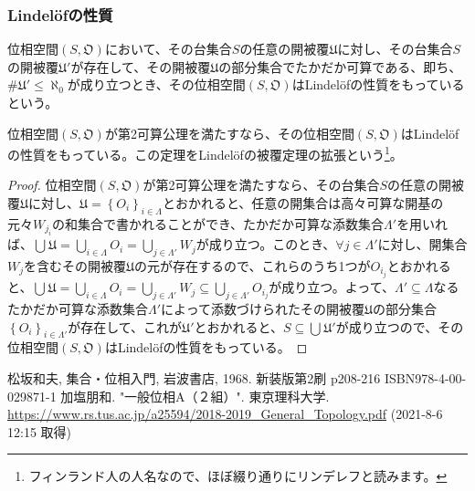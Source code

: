\documentclass[dvipdfmx]{jsarticle}
\begin{document}
\subsubsection{Lindelöfの性質}%
\begin{dfn}
位相空間$\left( S,\mathfrak{O} \right)$において、その台集合$S$の任意の開被覆$\mathfrak{U}$に対し、その台集合$S$の開被覆$\mathfrak{U}'$が存在して、その開被覆$\mathfrak{U}$の部分集合でたかだか可算である、即ち、${\#}\mathfrak{U}' \leq \aleph_{0}$が成り立つとき、その位相空間$\left( S,\mathfrak{O} \right)$はLindelöfの性質をもっているという。
\end{dfn}
\begin{thm}[Lindelöfの被覆定理の拡張]\label{8.1.6.16}
位相空間$\left( S,\mathfrak{O} \right)$が第2可算公理を満たすなら、その位相空間$\left( S,\mathfrak{O} \right)$はLindelöfの性質をもっている。この定理をLindelöfの被覆定理の拡張という\footnote{フィンランド人の人名なので、ほぼ綴り通りにリンデレフと読みます。}。
\end{thm}
\begin{proof}
位相空間$\left( S,\mathfrak{O} \right)$が第2可算公理を満たすなら、その台集合$S$の任意の開被覆$\mathfrak{U}$に対し、$\mathfrak{U} =\left\{ O_{i} \right\}_{i \in \varLambda}$とおかれると、任意の開集合は高々可算な開基の元々$W_{j_{i}}$の和集合で書かれることができ、たかだか可算な添数集合$\varLambda'$を用いれば、$\bigcup_{} \mathfrak{U} = \bigcup_{i \in \varLambda} O_{i} = \bigcup_{j \in \varLambda' } W_{j}$が成り立つ。このとき、$\forall j \in \varLambda'$に対し、開集合$W_{j}$を含むその開被覆$\mathfrak{U}$の元が存在するので、これらのうち1つが$O_{i_{j}}$とおかれると、$\bigcup_{} \mathfrak{U} = \bigcup_{i \in \varLambda} O_{i} = \bigcup_{j \in \varLambda' } W_{j} \subseteq \bigcup_{j \in \varLambda' } O_{i_{j}}$が成り立つ。よって、$\varLambda' \subseteq \varLambda$なるたかだか可算な添数集合$\varLambda'$によって添数づけられたその開被覆$\mathfrak{U}$の部分集合$\left\{ O_{i} \right\}_{i \in \varLambda' }$が存在して、これが$\mathfrak{U}'$とおかれると、$S \subseteq \bigcup_{} \mathfrak{U}'$が成り立つので、その位相空間$\left( S,\mathfrak{O} \right)$はLindelöfの性質をもっている。
\end{proof}
\begin{thebibliography}{50}
  松坂和夫, 集合・位相入門, 岩波書店, 1968. 新装版第2刷 p208-216 ISBN978-4-00-029871-1
  加塩朋和. "一般位相A（２組）". 東京理科大学. \url{https://www.rs.tus.ac.jp/a25594/2018-2019_General_Topology.pdf} (2021-8-6 12:15 取得)
\end{thebibliography}
\end{document}
